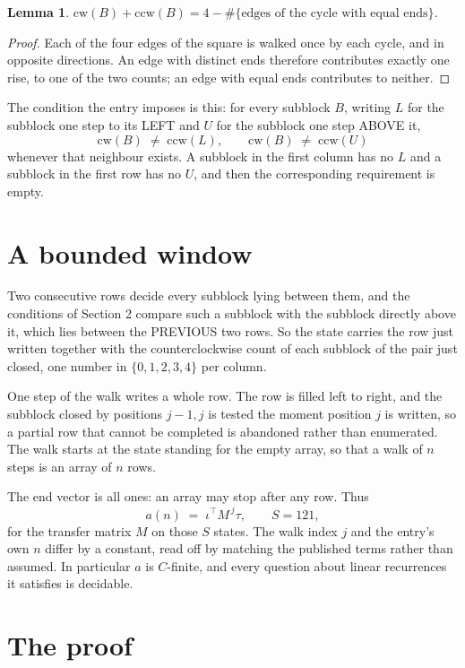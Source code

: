 \documentclass[11pt,a4paper]{article}
\theoremstyle{plain}
\newtheorem{lemma}[theorem]{Lemma}
\theoremstyle{definition}
\begin{document}
\begin{lemma}\label{lem:sum}
$\mathrm{cw}(B)+\mathrm{ccw}(B)=4-\#\{\text{edges of the cycle with equal ends}\}$.
\end{lemma}

\begin{proof}
Each of the four edges of the square is walked once by each cycle, and in opposite directions.
An edge with distinct ends therefore contributes exactly one rise, to one of the two counts;
an edge with equal ends contributes to neither.
\end{proof}

The condition the entry imposes is this: for every subblock $B$, writing $L$ for the subblock one step to its LEFT and $U$ for the subblock one step ABOVE it,
\[
\mathrm{cw}(B)\;\ne\;\mathrm{ccw}(L),\qquad \mathrm{cw}(B)\;\ne\;\mathrm{ccw}(U)
\]
whenever that neighbour exists. A subblock in the first column has no $L$ and a subblock in the first row has no $U$, and then the corresponding requirement is empty.

\section{A bounded window}

Two consecutive rows decide every subblock lying between them, and the conditions of Section 2 compare such a subblock with the subblock directly above it, which lies between the PREVIOUS two rows. So the state carries the row just written together with the counterclockwise count of each subblock of the pair just closed, one number in $\{0,1,2,3,4\}$ per column.

One step of the walk writes a whole row. The row is filled left to right, and the subblock
closed by positions $j-1,j$ is tested the moment position $j$ is written, so a partial row that
cannot be completed is abandoned rather than enumerated. The walk starts at the state standing
for the empty array, so that a walk of $n$ steps is an array of $n$ rows.

The end vector is all ones: an array may stop after any row. Thus
\[
a(n)\;=\;\iota^{\!\top}M^{\,j}\tau ,\qquad S=121,
\]
for the transfer matrix $M$ on those $S$ states. The walk index $j$ and the entry's own $n$
differ by a constant, read off by matching the published terms rather than assumed. In
particular $a$ is $C$-finite, and every question about linear recurrences it satisfies is
decidable.

\section{The proof}
\end{document}
